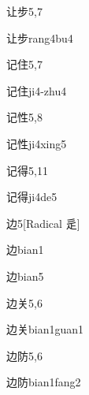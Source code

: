 \begin{entry}{让步}{5,7}
  \begin{phonetics}{让步}{rang4bu4}
  \end{phonetics}
\end{entry}

\begin{entry}{记住}{5,7}
  \begin{phonetics}{记住}{ji4-zhu4}
  \end{phonetics}
\end{entry}

\begin{entry}{记性}{5,8}
  \begin{phonetics}{记性}{ji4xing5}
  \end{phonetics}
\end{entry}

\begin{entry}{记得}{5,11}
  \begin{phonetics}{记得}{ji4de5}
  \end{phonetics}
\end{entry}

\begin{entry}{边}{5}[Radical 辵]
  \begin{phonetics}{边}{bian1}
  \end{phonetics}
  \begin{phonetics}{边}{bian5}
  \end{phonetics}
\end{entry}

\begin{entry}{边关}{5,6}
  \begin{phonetics}{边关}{bian1guan1}
  \end{phonetics}
\end{entry}

\begin{entry}{边防}{5,6}
  \begin{phonetics}{边防}{bian1fang2}
  \end{phonetics}
\end{entry}

